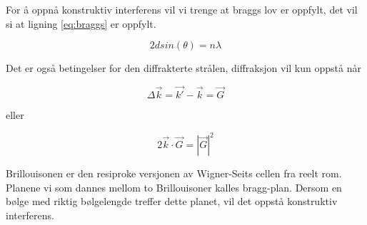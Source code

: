 For å oppnå konstruktiv interferens vil vi trenge at braggs lov er oppfylt, det vil si at ligning \ref{eq:braggs} er oppfylt.

\begin{equation}
\label{eq:braggs}
    2dsin(\theta)= n\lambda
\end{equation}

Det er også betingelser for den diffrakterte strålen, diffraksjon vil kun oppstå når 

\begin{equation}
    \Delta\Vec{k} = \Vec{k'}-\Vec{k} = \Vec{G}
\end{equation}

eller

\begin{equation}
    2\Vec{k}\cdot\Vec{G} = |\Vec{G}|^2
\end{equation}

Brillouisonen er den resiproke versjonen av Wigner-Seits cellen fra reelt rom. Planene vi som dannes mellom to Brillouisoner kalles bragg-plan. Dersom en bølge med riktig bølgelengde treffer dette planet, vil det oppstå konstruktiv interferens.

\newpage

